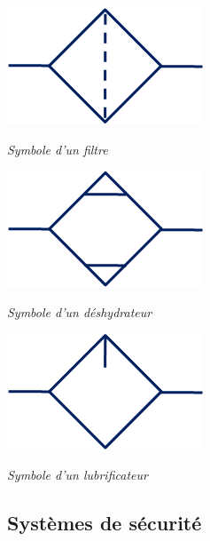 \documentclass[10pt]{article}
\begin{document}
\begin{minipage}[c]{.3\textwidth}
\begin{center}
\includegraphics[width=.3\textwidth]{images/Symb_Filtre}

\textit{Symbole d'un filtre}
\end{center}
\end{minipage} \hfill
\begin{minipage}[c]{.3\textwidth}
\begin{center}
\includegraphics[width=.3\textwidth]{images/Symb_Deshydrateur}

\textit{Symbole d'un déshydrateur}
\end{center}
\end{minipage} \hfill
\begin{minipage}[c]{.3\textwidth}
\begin{center}
\includegraphics[width=.3\textwidth]{images/Symb_Lubrificateur}

\textit{Symbole d'un lubrificateur}
\end{center}
\end{minipage} 



\subsection{Systèmes de sécurité}
\end{document}

